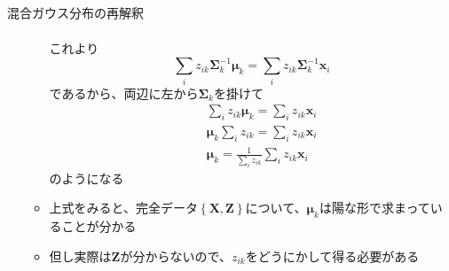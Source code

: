 \documentclass[dvipdfmx,notheorems,t]{beamer}
\begin{document}
\begin{frame}{混合ガウス分布の再解釈}
\begin{itemize}
\begin{itemize}
\begin{eqnarray}
		\end{eqnarray}
		これより
		\begin{equation}
			\sum_i z_{ik} \bm{\Sigma}_k^{-1} \bm{\mu}_k = \sum_i z_{ik} \bm{\Sigma}_k^{-1} \bm{x}_i
		\end{equation}
		であるから、両辺に左から$\bm{\Sigma}_k$を掛けて
		\begin{eqnarray}
			&& \sum_i z_{ik} \bm{\mu}_k = \sum_i z_{ik} \bm{x}_i \nonumber \\
			&& \bm{\mu}_k \sum_i z_{ik} = \sum_i z_{ik} \bm{x}_i \nonumber \\
			&& \bm{\mu}_k = \frac{1}{\sum_i z_{ik}} \sum_i z_{ik} \bm{x}_i
		\end{eqnarray}
		のようになる
		\newline
		
		\item 上式をみると、完全データ$\left\{ \bm{X}, \bm{Z} \right\}$について、$\bm{\mu}_k$は陽な形で求まっていることが分かる
		\item 但し実際は$\bm{Z}$が分からないので、$z_{ik}$をどうにかして得る必要がある
	\end{itemize}
\end{itemize}

\end{frame}
\end{document}
